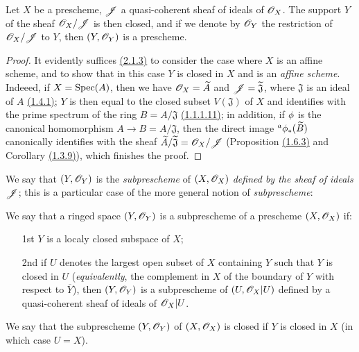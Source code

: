 \begin{prop}[4.1.2]
\label{prop-1.4.1.2}
Let $X$ be a prescheme, $\mathscr{J}$ a quasi-coherent sheaf of ideals of $\mathscr{O}_X$. The support
$Y$ of the sheaf $\mathscr{O}_X/\mathscr{J}$ is then closed, and if we denote by $\mathscr{O}_Y$ the restriction
of $\mathscr{O}_X/\mathscr{J}$ to $Y$, then $(Y,\mathscr{O}_Y)$ is a prescheme.
\end{prop}

\begin{proof}
\label{proof-prop-1.4.1.2}
It evidently suffices \hyperref[prop-1.2.1.3]{(2.1.3)} to consider the case where $X$ is an
affine scheme, and to show that in this case $Y$ is closed in $X$ and is an {\it affine
scheme}. Indeeed, if $X={\mathop{\mathrm{Spec}}\nolimits}(A)$, then we have $\mathscr{O}_X=\widetilde{A}$ and
$\mathscr{J}=\widetilde{\mathfrak{J}}$, where $\mathfrak{J}$ is an ideal of $A$
\hyperref[thm-1.1.4.1]{(1.4.1)}; $Y$ is then equal to the closed subset $V(\mathfrak{J})$ of
$X$ and identifies with the prime spectrum of the ring $B=A/\mathfrak{J}$
\hyperref[prop-1.1.1.11]{(1.1.1.11)}; in addition, if $\phi$ is the canonical
homomorphism $A\to B=A/\mathfrak{J}$, then the direct image ${}^a\phi_*(\widetilde{B})$
canonically identifies with the sheaf $\widetilde{A}/\widetilde{\mathfrak{J}}=\mathscr{O}_X/\mathscr{J}$
(Proposition \hyperref[prop-1.1.6.3]{(1.6.3)} and Corollary \hyperref[cor-1.1.3.9]{(1.3.9)}),
which finishes the proof.
\end{proof}

We say that $(Y,\mathscr{O}_Y)$ is the {\it subprescheme} of $(X,\mathscr{O}_X)$ {\it defined by the
sheaf of ideals $\mathscr{J}$}; this is a particular case of the more general notion of
{\it subprescheme}:

\begin{defn}[4.1.3]
\label{defn-1.4.1.3}
We say that a ringed space $(Y,\mathscr{O}_Y)$ is a subprescheme of a prescheme $(X,\mathscr{O}_X)$ if:
\begin{itemize}
  \item[1st] $Y$ is a localy closed subspace of $X$;
  \item[2nd] if $U$ denotes the largest open subset of $X$ containing $Y$ such that
             $Y$ is closed in $U$ ({\it equivalently}, the complement in $X$ of the
             boundary of $Y$ with respect to $\overline{Y}$), then $(Y,\mathscr{O}_Y)$ is
             a subprescheme of $(U,\mathscr{O}_X|U)$ defined by a quasi-coherent sheaf of ideals of
             $\mathscr{O}_X|U$.
\end{itemize}
We say that the subprescheme $(Y,\mathscr{O}_Y)$ of $(X,\mathscr{O}_X)$ is closed if $Y$ is closed in $X$
(in which case $U=X$).
\end{defn}

